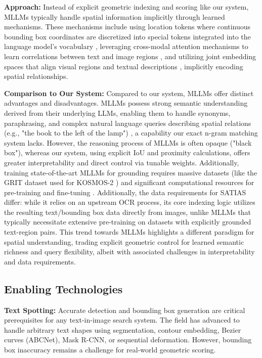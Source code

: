 \documentclass[manuscript,screen]{acmart}
\begin{document}
\textbf{Approach:} Instead of explicit geometric indexing and scoring like our system, MLLMs typically handle spatial information implicitly through learned mechanisms. These mechanisms include using location tokens where continuous bounding box coordinates are discretized into special tokens integrated into the language model's vocabulary \cite{Huang24}, leveraging cross-modal attention mechanisms to learn correlations between text and image regions \cite{Tan23ESA}, and utilizing joint embedding spaces that align visual regions and textual descriptions \cite{Karpathy15}, implicitly encoding spatial relationships.

\textbf{Comparison to Our System:} Compared to our system, MLLMs offer distinct advantages and disadvantages. MLLMs possess strong semantic understanding derived from their underlying LLMs, enabling them to handle synonyms, paraphrasing, and complex natural language queries describing spatial relations (e.g., "the book to the left of the lamp") \cite{Huang24, Yin24}, a capability our exact n-gram matching system lacks. However, the reasoning process of MLLMs is often opaque ("black box"), whereas our system, using explicit IoU and proximity calculations, offers greater interpretability and direct control via tunable weights. Additionally, training state-of-the-art MLLMs for grounding requires massive datasets (like the GRIT dataset used for KOSMOS-2 \cite{Huang24}) and significant computational resources for pre-training and fine-tuning \cite{Yin24}. Additionally, the data requirements for SATIAS differ: while it relies on an upstream OCR process, its core indexing logic utilizes the resulting text/bounding box data directly from images, unlike MLLMs that typically necessitate extensive pre-training on datasets with explicitly grounded text-region pairs. This trend towards MLLMs highlights a different paradigm for spatial understanding, trading explicit geometric control for learned semantic richness and query flexibility, albeit with associated challenges in interpretability and data requirements.

\subsection{Enabling Technologies}

\textbf{Text Spotting:} Accurate detection and bounding box generation are critical prerequisites for any text-in-image search system. The field has advanced to handle arbitrary text shapes using segmentation, contour embedding, Bezier curves (ABCNet), Mask R-CNN, or sequential deformation. However, bounding box inaccuracy remains a challenge for real-world geometric scoring.
\end{document}
